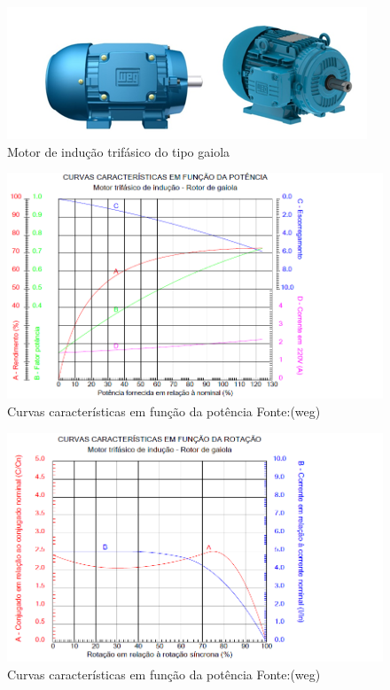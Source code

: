 
\begin{figure}[!ht]
\centering
\includegraphics[scale=0.8]{figuras/motorgaiola.png}
\caption{Motor de indução trifásico do tipo gaiola}
\label{fig:motorgaiola}
\end{figure}

\begin{figure}[!ht]
\centering
\includegraphics[scale=0.8]{figuras/Motor_potencia.png}
\caption{Curvas características em função da potência Fonte:(weg)}
\label{fig:motor_potencia}
\end{figure}

\begin{figure}[!ht]
\centering
\includegraphics[scale=0.8]{figuras/motor_rota__o.png}
\caption{Curvas características em função da potência Fonte:(weg)}
\label{fig:motor_rota__o}
\end{figure}

